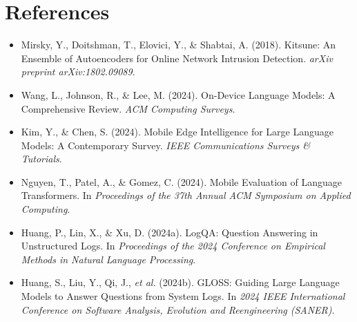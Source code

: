 \documentclass[11pt]{article}
\begin{document}
\section*{References}
\begin{itemize}
    \item Mirsky, Y., Doitshman, T., Elovici, Y., \& Shabtai, A. (2018). Kitsune: An Ensemble of Autoencoders for Online Network Intrusion Detection. \textit{arXiv preprint arXiv:1802.09089}.
    \item Wang, L., Johnson, R., \& Lee, M. (2024). On-Device Language Models: A Comprehensive Review. \textit{ACM Computing Surveys}.
    \item Kim, Y., \& Chen, S. (2024). Mobile Edge Intelligence for Large Language Models: A Contemporary Survey. \textit{IEEE Communications Surveys \& Tutorials}.
    \item Nguyen, T., Patel, A., \& Gomez, C. (2024). Mobile Evaluation of Language Transformers. In \textit{Proceedings of the 37th Annual ACM Symposium on Applied Computing}.
    \item Huang, P., Lin, X., \& Xu, D. (2024a). LogQA: Question Answering in Unstructured Logs. In \textit{Proceedings of the 2024 Conference on Empirical Methods in Natural Language Processing}.
    \item Huang, S., Liu, Y., Qi, J., \textit{et al.} (2024b). GLOSS: Guiding Large Language Models to Answer Questions from System Logs. In \textit{2024 IEEE International Conference on Software Analysis, Evolution and Reengineering (SANER)}.
\end{itemize}
\end{document}
